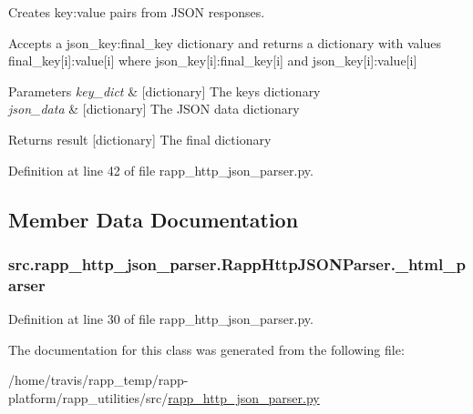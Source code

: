 Creates key\-:value pairs from J\-S\-O\-N responses. 

Accepts a json\-\_\-key\-:final\-\_\-key dictionary and returns a dictionary with values final\-\_\-key\mbox{[}i\mbox{]}\-:value\mbox{[}i\mbox{]} where json\-\_\-key\mbox{[}i\mbox{]}\-:final\-\_\-key\mbox{[}i\mbox{]} and json\-\_\-key\mbox{[}i\mbox{]}\-:value\mbox{[}i\mbox{]}


\begin{DoxyParams}{Parameters}
{\em key\-\_\-dict} & \mbox{[}dictionary\mbox{]} The keys dictionary \\
\hline
{\em json\-\_\-data} & \mbox{[}dictionary\mbox{]} The J\-S\-O\-N data dictionary\\
\hline
\end{DoxyParams}
\begin{DoxyReturn}{Returns}
result \mbox{[}dictionary\mbox{]} The final dictionary 
\end{DoxyReturn}


Definition at line 42 of file rapp\-\_\-http\-\_\-json\-\_\-parser.\-py.



\subsection{Member Data Documentation}
\hypertarget{classsrc_1_1rapp__http__json__parser_1_1RappHttpJSONParser_a7d5fd55ad946ad4e9fedc331b27a0f9f}{
\subsubsection[{\-\_\-html\-\_\-parser}]{\setlength{\rightskip}{0pt plus 5cm}src.\-rapp\-\_\-http\-\_\-json\-\_\-parser.\-Rapp\-Http\-J\-S\-O\-N\-Parser.\-\_\-html\-\_\-parser\hspace{0.3cm}{\ttfamily [private]}}}\label{classsrc_1_1rapp__http__json__parser_1_1RappHttpJSONParser_a7d5fd55ad946ad4e9fedc331b27a0f9f}


Definition at line 30 of file rapp\-\_\-http\-\_\-json\-\_\-parser.\-py.



The documentation for this class was generated from the following file\-:\begin{DoxyCompactItemize}
\item 
/home/travis/rapp\-\_\-temp/rapp-\/platform/rapp\-\_\-utilities/src/\hyperlink{rapp__http__json__parser_8py}{rapp\-\_\-http\-\_\-json\-\_\-parser.\-py}\end{DoxyCompactItemize}
